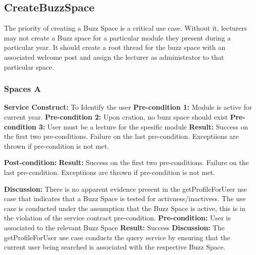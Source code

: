 
\subsection{CreateBuzzSpace}
The priority of creating a Buzz Space is a critical use case. Without it, lecturers may not create a Buzz space for a particular module they present during a particular year. It should create a root thread for the buzz space with an associated welcome post and assign the lecturer as administrator to that particular space.

\subsubsection{Spaces A}
\textbf{Service Construct:}  To Identify the user \newline
\textbf{Pre-condition 1:}  Module is active for current year.  \newline
\textbf{Pre-condition 2:}  Upon cration, no buzz space should exist \newline
\textbf{Pre-condition 3:}  User must be a lecture for the spesific module \newline
\textbf{Result:}  Success on the first two  pre-conditions. \newline
 Failure on the last pre-condition.\newline
 Exceptiions are thrown if pre-condition is not met. \newline \newline
 
 \textbf{Post-condition:}   \newline
 \textbf{Result:}  Success on the first two  pre-conditions. Failure on the last pre-condition.\newline
  Exceptiions are thrown if pre-condition is not met. \newline
  
\textbf{Discussion:}  There is no apparent evidence present in the getProfileForUser use case that indicates that a Buzz Space is tested for activness/inactivess.
The use case is conducted under the assumption that the Buzz Space is active, this is in the violation of the service contract pre-condition. \newline \newline
\textbf{Pre-condition:}  User is associated to the relevant Buzz Space\newline
\textbf{Result:}  Success \newline
\textbf{Discussion:}  The getProfileForUser use case conducts the query service by ensuring that the current user being searched is associated with the respective Buzz Space.
